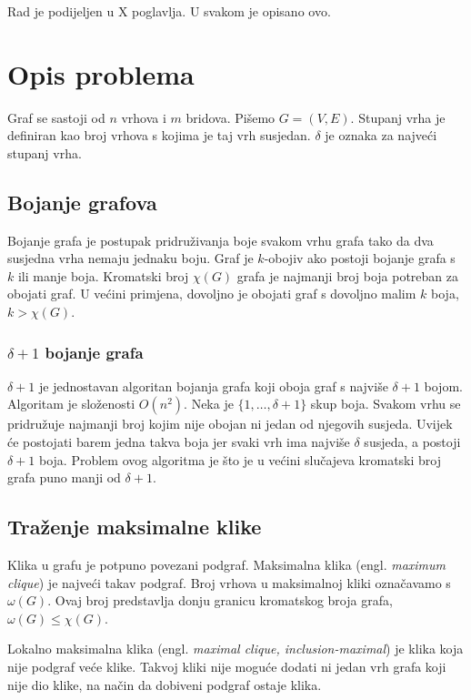 \documentclass[diplomskirad]{fer}
\begin{document}
Rad je podijeljen u X poglavlja. U svakom je opisano ovo.

\chapter{Opis problema}
\label{opis_problema}

Graf se sastoji od $n$ vrhova i $m$ bridova. Pišemo $G = (V, E)$. Stupanj vrha je definiran kao broj vrhova s kojima je taj vrh susjedan. $\delta$ je
oznaka za najveći stupanj vrha.

\section{Bojanje grafova}
Bojanje grafa je postupak pridruživanja boje svakom vrhu grafa tako da dva susjedna vrha nemaju jednaku boju. Graf je $k$-obojiv ako postoji
bojanje grafa s $k$ ili manje boja. Kromatski broj $\chi(G)$ grafa je najmanji broj boja potreban za obojati graf. U većini primjena,
dovoljno je obojati graf s dovoljno malim $k$ boja, $k > \chi(G)$.

\subsection{$\delta + 1$ bojanje grafa}
$\delta + 1$ je jednostavan algoritan bojanja grafa koji oboja graf s najviše $\delta + 1$ bojom. Algoritam je složenosti $O(n^2)$.
Neka je $\{1, \dots, \delta + 1\}$ skup boja. Svakom vrhu se pridružuje najmanji broj kojim nije obojan ni jedan od njegovih susjeda. Uvijek će postojati
barem jedna takva boja jer svaki vrh ima najviše $\delta$ susjeda, a postoji $\delta + 1$ boja. Problem ovog algoritma je što je u većini slučajeva 
kromatski broj grafa puno manji od $\delta + 1$.

\section{Traženje maksimalne klike}
Klika u grafu je potpuno povezani podgraf. Maksimalna klika (engl. \textit{maximum clique}) je najveći takav podgraf. Broj vrhova u maksimalnoj kliki označavamo s $\omega(G)$.
Ovaj broj predstavlja donju granicu kromatskog broja grafa, $\omega(G) \leq \chi(G)$.

Lokalno maksimalna klika (engl. \textit{maximal clique, inclusion-maximal}) je klika koja nije podgraf veće klike. Takvoj kliki nije moguće dodati ni jedan
vrh grafa koji nije dio klike, na način da dobiveni podgraf ostaje klika.
\end{document}
